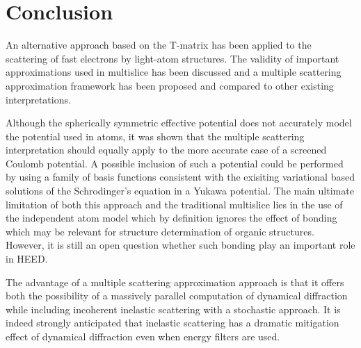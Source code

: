 \section{Conclusion}

An alternative approach based on the T-matrix has been applied to the
scattering of fast electrons by light-atom structures.
The validity of important approximations used in multislice has been
discussed and a multiple scattering approximation framework has been proposed
and compared to other existing interpretations.

Although the spherically symmetric effective potential does not accurately
model the potential used in atoms, it was shown that the multiple scattering
interpretation should equally apply to the more accurate case of a screened
Coulomb potential. A possible inclusion of such a potential could be performed
by using a family of basis functions consistent with the exisiting variational
based solutions of the Schrodinger's equation in a Yukawa potential.
The main ultimate limitation of both this approach and the traditional
multislice lies in the use of the independent atom model which by definition
ignores the effect of bonding which may be relevant for structure determination
of organic structures. However, it is still an open question whether such bonding
play an important role in HEED.

The advantage of a multiple scattering approximation approach is that it offers
both the possibility of a massively parallel computation of dynamical diffraction
while including incoherent inelastic scattering with a stochastic approach.
It is indeed strongly anticipated that inelastic scattering has a dramatic
mitigation effect of dynamical diffraction even when energy filters are used.
